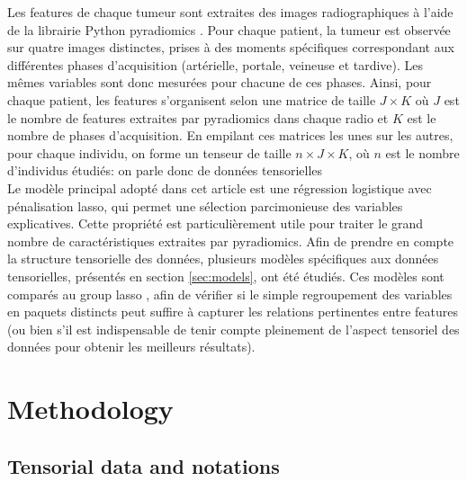 \documentclass[preprint,12pt]{elsarticle}
\begin{document}
\indent Les features de chaque tumeur sont extraites des images radiographiques à l'aide de la librairie Python pyradiomics \cite{pyradio}. Pour chaque patient, la tumeur est observée sur quatre images distinctes, prises à des moments spécifiques correspondant aux différentes phases d'acquisition (artérielle, portale, veineuse et tardive). Les mêmes variables sont donc mesurées pour chacune de ces phases. Ainsi, pour chaque patient, les features s'organisent selon une matrice de taille $J \times K$ où $J$ est le nombre de features extraites par pyradiomics dans chaque radio et $K$ est le nombre de phases d'acquisition. En empilant ces matrices les unes sur les autres, pour chaque individu, on forme un tenseur de taille $n \times J \times K$, où $n$ est le nombre d'individus étudiés: on parle donc de données tensorielles\\
Le modèle principal adopté dans cet article est une régression logistique avec pénalisation lasso, qui permet une sélection parcimonieuse des variables explicatives. Cette propriété est particulièrement utile pour traiter le grand nombre de caractéristiques extraites par pyradiomics. Afin de prendre en compte la structure tensorielle des données, plusieurs modèles spécifiques aux données tensorielles, présentés en section \ref{sec:models}, ont été étudiés. Ces modèles sont comparés au group lasso \cite{grp_lasso}, afin de vérifier si le simple regroupement des variables en paquets distincts peut suffire à capturer les relations pertinentes entre features (ou bien s'il est indispensable de tenir compte pleinement de l'aspect tensoriel des données pour obtenir les meilleurs résultats). \\




\section{Methodology}

\subsection{Tensorial data and notations}
\end{document}
